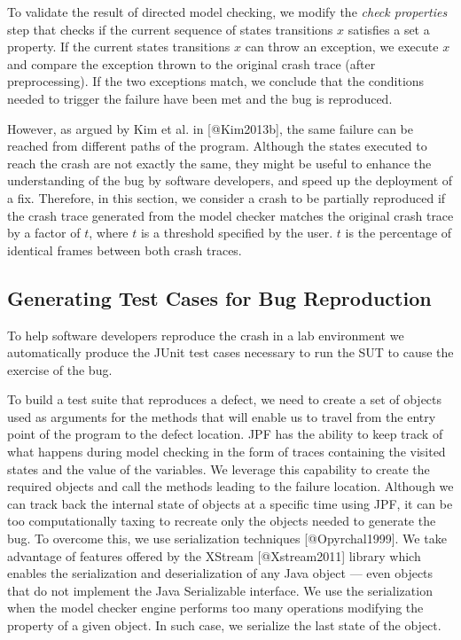 To validate the result of directed model checking, we modify the
{\emph{check properties}} step that checks if the current sequence of
states transitions \(x\) satisfies a set a property. If the current
states transitions \(x\) can throw an exception, we execute \(x\) and
compare the exception thrown to the original crash trace (after
preprocessing). If the two exceptions match, we conclude that the
conditions needed to trigger the failure have been met and the bug is
reproduced.

However, as argued by Kim et al. in {[}@Kim2013b{]}, the same failure
can be reached from different paths of the program. Although the states
executed to reach the crash are not exactly the same, they might be
useful to enhance the understanding of the bug by software developers,
and speed up the deployment of a fix. Therefore, in this section, we
consider a crash to be partially reproduced if the crash trace generated
from the model checker matches the original crash trace by a factor of
\(t\), where \(t\) is a threshold specified by the user. \(t\) is the
percentage of identical frames between both crash traces.

\subsection{Generating Test Cases for Bug
Reproduction}\label{generating-test-cases-for-bug-reproduction}

To help software developers reproduce the crash in a lab environment we
automatically produce the JUnit test cases necessary to run the SUT to
cause the exercise of the bug.

To build a test suite that reproduces a defect, we need to create a set
of objects used as arguments for the methods that will enable us to
travel from the entry point of the program to the defect location. JPF
has the ability to keep track of what happens during model checking in
the form of traces containing the visited states and the value of the
variables. We leverage this capability to create the required objects
and call the methods leading to the failure location. Although we can
track back the internal state of objects at a specific time using JPF,
it can be too computationally taxing to recreate only the objects needed
to generate the bug. To overcome this, we use serialization techniques
{[}@Opyrchal1999{]}. We take advantage of features offered by the
XStream {[}@Xstream2011{]} library which enables the serialization and
deserialization of any Java object --- even objects that do not
implement the Java Serializable interface. We use the serialization when
the model checker engine performs too many operations modifying the
property of a given object. In such case, we serialize the last state of
the object.


